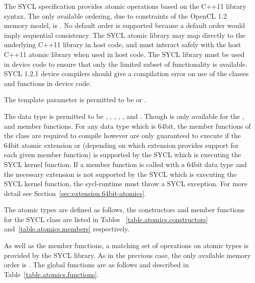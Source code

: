 The SYCL specification provides atomic operations based on the C++11
library syntax. The only available ordering, due to constraints of the
OpenCL 1.2 memory model, is . No
default order is supported because a default order would imply
sequential consistency. The SYCL atomic library may map directly to
the underlying C++11 library in host code, and must interact safely
with the host C++11 atomic library when used in host code. The SYCL
library must be used in device code to ensure that only the limited
subset of functionality is available. SYCL 1.2.1 device compilers should
give a compilation error on use of the 
classes and functions in device code.

The template parameter  is permitted to be
 or .

The data type  is permitted to be , , , , ,  and . Though
 is only available for the ,  and  member functions. For any data type
 which is 64bit, the member functions of the 
class are required to compile however are only guaranteed to execute if the
64bit atomic extension  or  (depending on which extension provides support
for each given member function) is supported by the SYCL 
which is executing the SYCL kernel function. If a member function is called with
a 64bit data type and the necessary extension is not supported by the SYCL
 which is executing the SYCL kernel function, the
\gls{sycl-runtime} must throw a SYCL 
exception. For more detail see Section~\ref{sec:extension.64bit-atomics}.

The atomic types are defined as follows, the constructors and member functions
for the SYCL  class are listed in Tables~
\ref{table.atomics.constructors} and~\ref{table.atomics.members} respectively.



As well as the member functions, a matching set of operations on atomic types
is provided by the SYCL library. As in the previous case, the only available
memory order is . The global functions are as
follows and described in Table~\ref{table.atomics.functions}.

